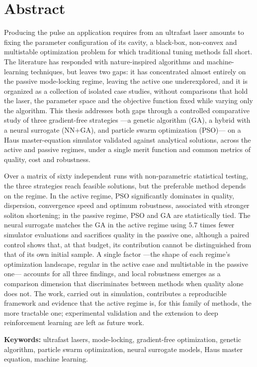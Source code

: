 \chapter*{Abstract}

Producing the pulse an application requires from an ultrafast laser amounts to fixing the
parameter configuration of its cavity, a black-box, non-convex and multistable optimization
problem for which traditional tuning methods fall short. The literature has responded with
nature-inspired algorithms and machine-learning techniques, but leaves two gaps: it has
concentrated almost entirely on the passive mode-locking regime, leaving the active one
underexplored, and it is organized as a collection of isolated case studies, without
comparisons that hold the laser, the parameter space and the objective function fixed while
varying only the algorithm. This thesis addresses both gaps through a controlled comparative
study of three gradient-free strategies —a genetic algorithm (GA), a hybrid with a neural
surrogate (NN+GA), and particle swarm optimization (PSO)— on a Haus master-equation simulator
validated against analytical solutions, across the active and passive regimes, under a single
merit function and common metrics of quality, cost and robustness.

Over a matrix of sixty independent runs with non-parametric statistical testing, the three
strategies reach feasible solutions, but the preferable method depends on the regime. In the active regime, PSO significantly dominates in quality, dispersion,
convergence speed and optimum robustness, associated with stronger soliton shortening; in the passive regime, PSO and GA are statistically
tied. The neural surrogate matches the GA in the active regime using $5{.}7$ times fewer
simulator evaluations and sacrifices quality in the passive one, although a paired control
shows that, at that budget, its contribution cannot be distinguished from that of its own
initial sample. A single factor —the shape of each regime's optimization landscape,
regular in the active case and multistable in the passive one— accounts for all three
findings, and local robustness emerges as a comparison dimension that discriminates between
methods when quality alone does not. The work, carried out in simulation, contributes a
reproducible framework and evidence that the active regime is, for this family of methods, the
more tractable one; experimental validation and the extension to deep reinforcement learning
are left as future work.

\vspace{1em}
\noindent\textbf{Keywords:} ultrafast lasers, mode-locking, gradient-free optimization,
genetic algorithm, particle swarm optimization, neural surrogate models, Haus master
equation, machine learning.
